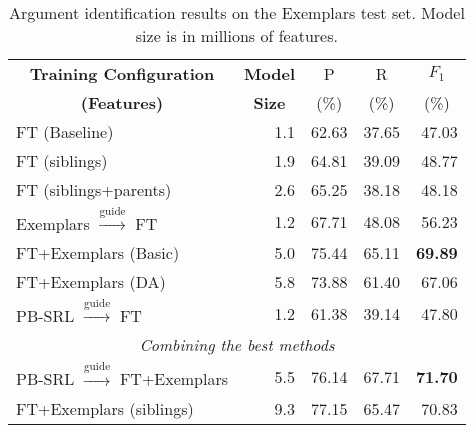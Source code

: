 
\setlength\tabcolsep{4pt}

\begin{table}\centering\small
\def\arraystretch{1}
\begin{tabular}{lrrrr}%
\toprule
\multicolumn{1}{c}{\textbf{Training Configuration}} 
& \multicolumn{1}{c}{\textbf{Model}} &  \multicolumn{1}{c}{P} &
\multicolumn{1}{c}{R} 
&  \multicolumn{1}{c}{$F_1$} \\
 \multicolumn{1}{c}{\textbf{(Features)}} 
& \multicolumn{1}{c}{\textbf{Size}} 
&  \multicolumn{1}{c}{(\%)} &  \multicolumn{1}{c}{(\%)} &  \multicolumn{1}{c}{(\%)}\\
\midrule
FT (Baseline) & 1.1 & 62.63 & 37.65 & 47.03 \\
\midrule
FT (siblings) & 1.9 & 64.81 & 39.09 & 48.77 \\
FT (siblings+parents) & 2.6 & 65.25 & 38.18 & 48.18 \\
\midrule
Exemplars $\xrightarrow{\text{guide}}$ FT & 1.2 & 67.71 & 48.08 & 56.23\\
FT+Exemplars (Basic) & 5.0 & 75.44 & 65.11 & \bf{69.89} \\
FT+Exemplars (DA) & 5.8 & 73.88 & 61.40 & 67.06 \\
\midrule
PB-SRL $\xrightarrow{\text{guide}}$ FT & 1.2 & 61.38 & 39.14 & 47.80 \\
\midrule
\multicolumn{5}{c}{\em{Combining the best methods}}\\
\midrule
PB-SRL $\xrightarrow{\text{guide}}$ FT+Exemplars & 5.5 & 76.14 & 67.71 & \textbf{71.70} \\
FT+Exemplars (siblings) & 9.3 & 77.15 & 65.47 & 70.83 \\
\bottomrule
\end{tabular}
\caption{Argument identification results on the Exemplars test set.
Model size is in millions of features.
\label{tbl:results}}
\end{table}

